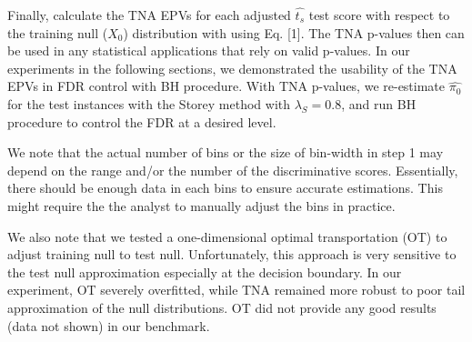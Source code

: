\documentclass{article}
\newcommand{\edit}[1]{{\color{red}#1}}
\begin{document}
	Finally, calculate the TNA EPVs for each adjusted $\hat{t_s}$ test score with respect to the \edit{training null ($X_0$)} distribution with using Eq. [1]. \edit{The TNA p-values then can be used in any statistical applications that rely on valid p-values. In our experiments in the following sections, we demonstrated the usability of the TNA EPVs in FDR control with BH procedure. With TNA p-values, we re-estimate $\hat{\pi_0}$ for the test instances with the Storey method with $\lambda_S= 0.8$}, and run BH procedure to control the FDR at a desired level. 
	
	\edit{We note that the actual number of bins or the size of bin-width in step 1 may depend on the range and/or the number of the discriminative scores. Essentially, there should be enough data in each bins to ensure accurate estimations. This might require the the analyst to manually adjust the bins in practice.}
	
	We also note that we tested a one-dimensional optimal transportation (OT) to adjust training null to test null. Unfortunately, this approach is very sensitive to the test null approximation especially at the decision boundary. In our experiment, OT severely overfitted, while TNA remained more robust to poor tail approximation of the null distributions. OT did not provide any good results (data not shown) in our benchmark. 
	
\end{document}
